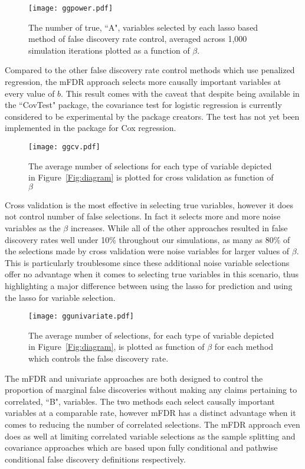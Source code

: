 \begin{figure} [!htb]
 \centering
  \texttt{[image: ggpower.pdf]}
  \caption{\label{Fig:lassopower} The number of true, ``A", variables selected by each lasso based method of false discovery rate control, averaged across 1,000 simulation iterations plotted as a function of $\beta$.}
\end{figure}

Compared to the other false discovery rate control methods which use penalized regression, the mFDR approach selects more causally important variables at every value of $b$. This result comes with the caveat that despite being available in the ``CovTest" package, the covariance test for logistic regression is currently considered to be experimental by the package creators. The test has not yet been implemented in the package for Cox regression. 

\begin{figure} [!htb]
 \centering
  \texttt{[image: ggcv.pdf]}
  \caption{The average number of selections for each type of variable depicted in Figure~\ref{Fig:diagram} is plotted for cross validation as function of $\beta$ }
\end{figure}

Cross validation is the most effective in selecting true variables, however it does not control number of false selections. In fact it selects more and more noise variables as the $\beta$ increases. While all of the other approaches resulted in false discovery rates well under 10\% throughout our simulations, as many as $80\%$ of the selections made by cross validation were noise variables for larger values of $\beta$. This is particularly troublesome since these additional noise variable selections offer no advantage when it comes to selecting true variables in this scenario, thus highlighting a major difference between using the lasso for prediction and using the lasso for variable selection.

\begin{figure} [!htb]
 \centering
  \texttt{[image: ggunivariate.pdf]}
  \caption{The average number of selections, for each type of variable depicted in Figure~\ref{Fig:diagram}, is plotted as function of $\beta$ for each method which controls the false discovery rate.}
\end{figure}

The mFDR and univariate approaches are both designed to control the proportion of marginal false discoveries without making any claims pertaining to correlated, ``B", variables. The two methods each select causally important variables at a comparable rate, however mFDR has a distinct advantage when it comes to reducing the number of correlated selections. The mFDR approach even does as well at limiting correlated variable selections as the sample splitting and covariance approaches which are based upon fully conditional and pathwise conditional false discovery definitions respectively. 

